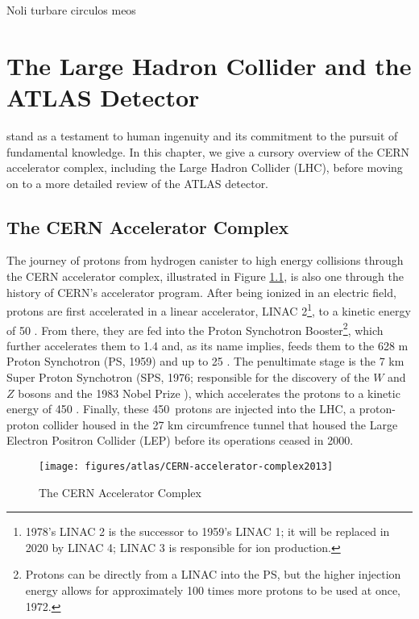\begin{savequote}[75mm]
Noli turbare circulos meos
\end{savequote}

\chapter{The Large Hadron Collider and the ATLAS Detector}

 stand as a testament to human ingenuity and its commitment to the pursuit of fundamental knowledge.  In this chapter, we give a cursory overview of the CERN accelerator complex, including the Large Hadron Collider (LHC), before moving on to a more detailed review of the ATLAS detector.

\section{The CERN Accelerator Complex}
The journey of protons from hydrogen canister to high energy collisions through the CERN accelerator complex, illustrated in Figure \ref{fig:cern}, is also one through the history of CERN's accelerator program.  After being ionized in an electric field, protons are first accelerated in a linear accelerator, LINAC 2\footnote{1978's LINAC 2 is the successor to 1959's LINAC 1; it will be replaced in 2020 by LINAC 4; LINAC 3 is responsible for ion production.}, to a kinetic energy of 50 \MeV.  From there, they are fed into the Proton Synchotron Booster\footnote{Protons can be directly from a LINAC into the PS, but the higher injection energy allows for approximately 100 times more protons to be used at once\cite{booster}, 1972.}, which further accelerates them to 1.4 \GeV and, as its name implies, feeds them to the 628 m Proton Synchotron (PS, 1959\cite{ps}) and up to 25 \GeV.  The penultimate stage is the 7 km Super Proton Synchotron (SPS, 1976; responsible for the discovery of the $W$ and $Z$ bosons and the 1983 Nobel Prize \cite{sps}), which accelerates the protons to a kinetic energy of 450 \GeV.  Finally, these 450 \GeV\,protons are injected into the LHC\cite{lhcjinst}, a proton-proton collider housed in the 27 km circumfrence tunnel that housed the Large Electron Positron Collider (LEP) before its operations ceased in 2000.  

\begin{figure}[!htbp]\captionsetup{justification=centering}
  \centering
  \texttt{[image: figures/atlas/CERN-accelerator-complex2013]}
  \caption{The CERN Accelerator Complex \cite{rings}}
  \label{fig:cern}
\end{figure}


